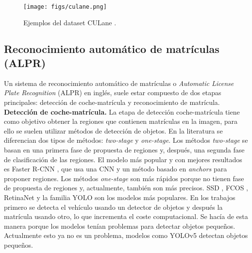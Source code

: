 \documentclass[a4paper, oneside, onecolumn, 11pt]{article}
\begin{document}
\begin{figure} [h!]
    \begin{center}
      \texttt{[image: figs/culane.png]}
    \end{center}
    \caption{Ejemplos del dataset CULane \cite{Pan2018}.}
    \label{fig:culane}
\end{figure}

\subsection{Reconocimiento automático de matrículas (ALPR)}

Un sistema de reconocimiento automático de matrículas o \textit{Automatic License Plate Recognition} (ALPR) en inglés, suele estar compuesto de dos etapas principales: detección de coche-matrícula y reconocimiento de matrícula.\\

\noindent\textbf{Detección de coche-matrícula.} La etapa de detección coche-matrícula tiene como objetivo obtener la regiones que contienen matrículas en la imagen, para ello se suelen utilizar métodos de detección de objetos. En la literatura se diferencian dos tipos de métodos: \textit{two-stage} y \textit{one-stage}. Los métodos \textit{two-stage} se basan en una primera fase de propuesta de regiones y, después, una segunda fase de clasificación de las regiones. El modelo más popular y con mejores resultados es Faster R-CNN \cite{ren2015faster}, que usa una CNN y un método basado en \textit{anchors} para proponer regiones. Los métodos \textit{one-stage} son más rápidos porque no tienen fase de propuesta de regiones y, actualmente, también son más precisos. SSD \cite{liu2016ssd}, FCOS \cite{tian2019fcos}, RetinaNet \cite{lin2017focal} y la familia YOLO \cite{redmon2016you} son los modelos más populares. En los trabajos \cite{laroca2018robust, laroca2021efficient} primero se detecta el vehículo usando un detector de objetos y después la matrícula usando otro, lo que incrementa el coste computacional. Se hacía de esta manera porque los modelos tenían problemas para detectar objetos pequeños. Actualmente esto ya no es un problema, modelos como YOLOv5 \cite{yolov5} detectan objetos pequeños.\\
\end{document}

